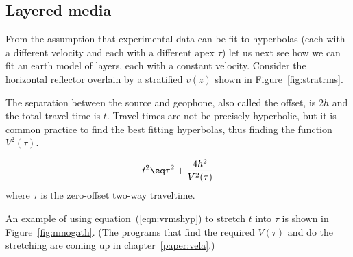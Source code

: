\subsection{Layered media}
\par
From the assumption that experimental data
can be fit to hyperbolas
(each with a different velocity and each with a different apex $\tau$)
let us next see how
we can fit an earth model of layers,
each with a constant velocity.
Consider the  horizontal reflector
overlain by a stratified  $v(z)$ 
shown in Figure~\ref{fig:stratrms}.%

The separation between the source and geophone,
also called the offset, is $2h$ and the total travel time is $t$.
Travel times are not be precisely hyperbolic,
but it is common practice to find the best fitting hyperbolas,
thus finding the function $V^2(\tau)$.

\begin{equation}
t^2 \eq \tau^2 + \frac{4h^2}{V^2(\tau)}
\label{eqn:vrmshyp}
\end{equation}
where $\tau$ is the zero-offset two-way traveltime.

\par
An example of using equation~(\ref{eqn:vrmshyp})
to stretch $t$ into $\tau$
is shown in Figure~\ref{fig:nmogath}.
(The programs that
find the required $V(\tau )$ and do the stretching are coming up in
chapter~\ref{paper:vela}.)


